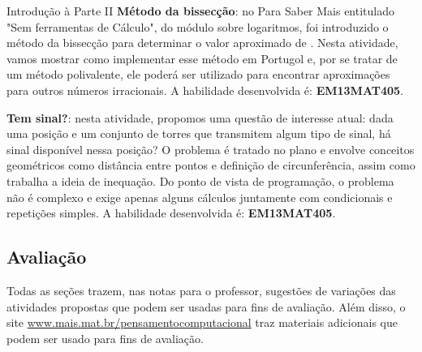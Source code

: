 \begin{apresentacao}{Introdução à Parte II}
\textbf{Método da bissecção}: no Para Saber Mais entitulado "Sem ferramentas de Cálculo", do módulo sobre logaritmos, foi introduzido o método da bissecção para determinar o valor aproximado de . Nesta atividade, vamos mostrar como implementar esse método em Portugol e, por se tratar de um método polivalente, ele poderá ser utilizado para encontrar aproximações para outros números irracionais. A habilidade desenvolvida é: \textbf{EM13MAT405}.

\textbf{Tem sinal?}: nesta atividade, propomos uma questão de interesse atual: dada uma posição e um conjunto de torres que transmitem algum tipo de sinal, há sinal disponível nessa posição? O problema é tratado no plano e envolve conceitos geométricos como distância entre pontos e definição de circunferência, assim como trabalha a ideia de inequação. Do ponto de vista de programação, o problema não é complexo e exige apenas alguns cálculos juntamente com condicionais e repetições simples. A habilidade desenvolvida é: \textbf{EM13MAT405}.

\subsection{Avaliação}

Todas as seções trazem, nas notas para o professor, sugestões de variações das atividades propostas que podem ser usadas para fins de avaliação. Além disso, o site \url{www.mais.mat.br/pensamentocomputacional} traz materiais adicionais que podem ser usado para fins de avaliação.
\end{apresentacao}

